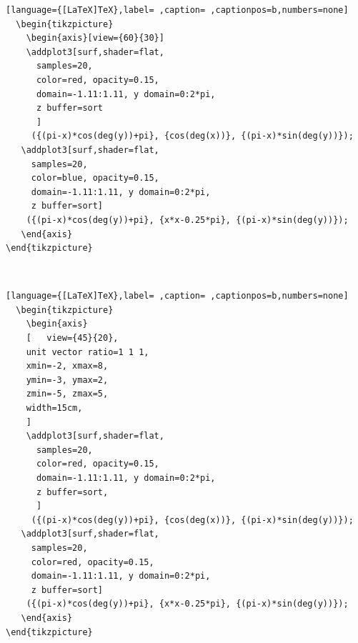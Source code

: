 \documentclass[a4paper,12pt]{article}
\begin{document}
\begin{lstlisting}[language={[LaTeX]TeX},label= ,caption= ,captionpos=b,numbers=none]
  \begin{tikzpicture}
    \begin{axis}[view={60}{30}]
    \addplot3[surf,shader=flat,
      samples=20,
      color=red, opacity=0.15,
      domain=-1.11:1.11, y domain=0:2*pi,
      z buffer=sort
      ]
     ({(pi-x)*cos(deg(y))+pi}, {cos(deg(x))}, {(pi-x)*sin(deg(y))});
   \addplot3[surf,shader=flat,
     samples=20,
     color=blue, opacity=0.15,
     domain=-1.11:1.11, y domain=0:2*pi,
     z buffer=sort]
    ({(pi-x)*cos(deg(y))+pi}, {x*x-0.25*pi}, {(pi-x)*sin(deg(y))});
   \end{axis}
\end{tikzpicture}
\end{lstlisting}

\\[0pt]

\begin{lstlisting}[language={[LaTeX]TeX},label= ,caption= ,captionpos=b,numbers=none]
  \begin{tikzpicture}
    \begin{axis}
    [   view={45}{20},
    unit vector ratio=1 1 1,
    xmin=-2, xmax=8,
    ymin=-3, ymax=2,
    zmin=-5, zmax=5,
    width=15cm,
    ]
    \addplot3[surf,shader=flat,
      samples=20,
      color=red, opacity=0.15,
      domain=-1.11:1.11, y domain=0:2*pi,
      z buffer=sort,
      ]
     ({(pi-x)*cos(deg(y))+pi}, {cos(deg(x))}, {(pi-x)*sin(deg(y))});
   \addplot3[surf,shader=flat,
     samples=20,
     color=red, opacity=0.15,
     domain=-1.11:1.11, y domain=0:2*pi,
     z buffer=sort]
    ({(pi-x)*cos(deg(y))+pi}, {x*x-0.25*pi}, {(pi-x)*sin(deg(y))});
   \end{axis}
\end{tikzpicture}
\end{lstlisting}

\\[0pt]
\end{document}
